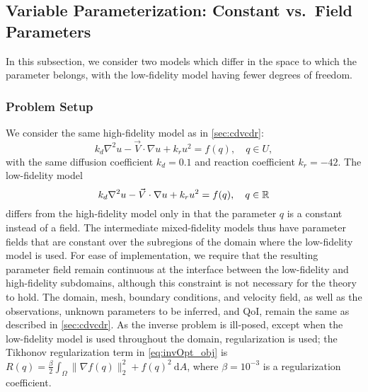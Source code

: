 \subsection{Variable Parameterization: Constant vs.\ Field Parameters} \label{sec:constvfield}

In this subsection, we consider two models which differ in the space to which the parameter belongs, with the low-fidelity model having fewer degrees of freedom. 

\subsubsection{Problem Setup}

We consider the same high-fidelity model as in \cref{sec:cdvcdr}:
\begin{equation}
k_d\nabla^2 u - \vec{V}\cdot\nabla u + k_ru^2= f(q),\quad q\in U,
\end{equation}
with the same diffusion coefficient $k_d = 0.1$  and reaction coefficient $k_r = -42$. The low-fidelity model
\begin{equation}
k_d\nabla^2 u - \vec{V}\cdot\nabla u + k_ru^2= f(q),\quad q\in{\mathbb{R}}
\end{equation}
differs from the high-fidelity model only in that the parameter $q$ is a constant instead of a field. The intermediate mixed-fidelity models thus have parameter fields that are constant over the subregions of the domain where the low-fidelity model is used. For ease of implementation, we require that the resulting parameter field remain continuous at the interface between the low-fidelity and high-fidelity subdomains, although this constraint is not necessary for the theory to hold. The domain, mesh, boundary conditions, and velocity field, as well as the observations, unknown parameters to be inferred, and QoI, remain the same as described in \cref{sec:cdvcdr}. As the inverse problem is ill-posed, except when the low-fidelity model is used throughout the domain, regularization is used; the Tikhonov regularization term in \cref{eq:invOpt_obj} is $R(q)=\frac{\beta}{2}\int_\Omega \|\nabla f(q)\|_2^2+f(q)^2\:\textrm{d}A$, where $\beta=10^{-3}$ is a regularization coefficient. 


